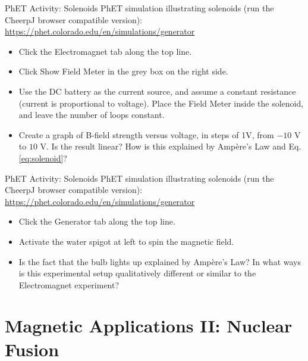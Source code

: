 \documentclass{beamer}
\begin{document}
\begin{frame}{PhET Activity: Solenoids}
PhET simulation illustrating solenoids (\alert{run the CheerpJ browser compatible version}): \\ \vspace{0.5cm}
\small
\url{https://phet.colorado.edu/en/simulations/generator}
\begin{itemize}
\item Click the Electromagnet tab along the top line.
\item Click Show Field Meter in the grey box on the right side.
\item Use the DC battery as the current source, and assume a constant resistance (current is proportional to voltage).  Place the Field Meter inside the solenoid, and leave the number of loops constant.
\item Create a graph of B-field strength versus voltage, in steps of 1V, from $-10$ V to $10$ V.  Is the result linear?  How is this explained by Amp\`{e}re's Law and Eq. \ref{eq:solenoid}?
\end{itemize}
\end{frame}

\begin{frame}{PhET Activity: Solenoids}
PhET simulation illustrating solenoids (\alert{run the CheerpJ browser compatible version}): \\ \vspace{0.5cm}
\small
\url{https://phet.colorado.edu/en/simulations/generator}
\begin{itemize}
\item Click the Generator tab along the top line.
\item Activate the water spigot at left to spin the magnetic field.
\item Is the fact that the bulb lights up explained by Amp\`{e}re's Law?  In what ways is this experimental setup qualitatively different or similar to the Electromagnet experiment?
\end{itemize}
\end{frame}


\section{Magnetic Applications II: Nuclear Fusion}
\end{document}
